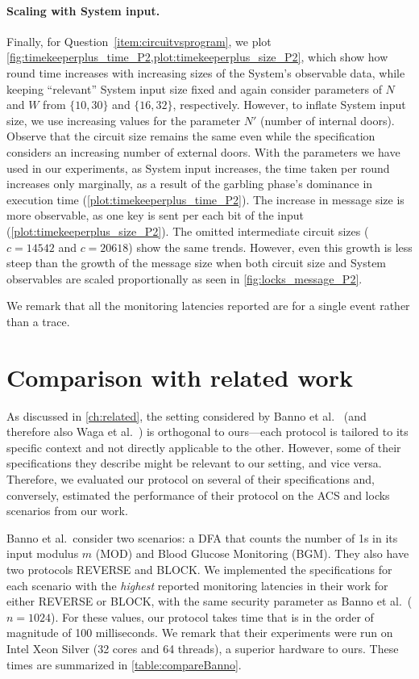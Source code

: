 \paragraph{Scaling with System input.}
Finally, for Question~\ref{item:circuitvsprogram}, we plot \cref{fig:timekeeperplus_time_P2,plot:timekeeperplus_size_P2}, which show how round time increases with increasing sizes of the System's observable data, while keeping ``relevant'' System input size fixed and again consider parameters of $N$ and $W$ from $\{10,30\}$ and $\{16,32\}$, respectively. However, to inflate System input size, we use increasing values for the parameter $N'$ (number of internal doors). Observe that the circuit size remains the same even while the specification considers an increasing number of external doors.
With the parameters we have used in our experiments, as System input increases, the time taken per round increases only marginally, as a result of the garbling phase's dominance in execution time (\cref{plot:timekeeperplus_time_P2}). The increase in message size is more observable, as one key is sent per each bit of the input (\cref{plot:timekeeperplus_size_P2}). The omitted intermediate circuit sizes ($c=14542$ and $c=20618$) show the same trends. However, even this growth is less steep than the growth of the message size when both circuit size and System observables are scaled proportionally as seen in \cref{fig:locks_message_P2}.

We remark that all the monitoring latencies reported are for a single event rather than a trace.

\section{Comparison with related work}\label{sec:comparison}

As discussed in \cref{ch:related}, the setting considered by Banno et al.~\cite{BMMBWS22} (and therefore also Waga et al.~\cite{WMSMBBS24}) is orthogonal to ours---each protocol is tailored to its specific context and not directly applicable to the other. However, some of their specifications they describe might be relevant to our setting, and vice versa. Therefore, we evaluated our protocol on several of their specifications and, conversely, estimated the performance of their protocol on the ACS and locks scenarios from our work.

Banno et al.\ consider two scenarios: a DFA that counts the number of 1s in its input modulus $m$ (MOD) and Blood Glucose Monitoring (BGM).
They also have two protocols REVERSE and BLOCK.
We implemented the specifications for each scenario with the \emph{highest} reported monitoring latencies in their work for either REVERSE or BLOCK, with the same security parameter as Banno et al.\ ($n=1024$). For these values, our protocol takes time that is in the order of magnitude of 100 milliseconds. We remark that their experiments were run on Intel Xeon Silver (32 cores and 64 threads), a superior hardware to ours. These times are summarized in \cref{table:compareBanno}.

